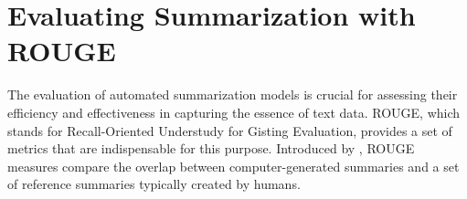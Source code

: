 

\section{Evaluating Summarization with ROUGE}
    The evaluation of automated summarization models is crucial for assessing their efficiency and effectiveness in capturing the essence of text data. ROUGE, which stands for Recall-Oriented Understudy for Gisting Evaluation, provides a set of metrics that are indispensable for this purpose. Introduced by \cite{lin-2004-rouge}, ROUGE measures compare the overlap between computer-generated summaries and a set of reference summaries typically created by humans.

